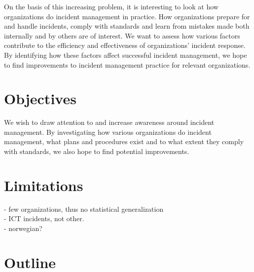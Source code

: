 On the basis of this increasing problem, it is interesting to look at how organizations do incident management in practice. How organizations prepare for and handle incidents, comply with standards and learn from mistakes made both internally and by others are of interest. We want to assess how various factors contribute to the efficiency and effectiveness of organizations’ incident response. By identifying how these factors affect successful incident management, we hope to find improvements to incident management practice for relevant organizations. 




\section{Objectives}
We wish to draw attention to and increase awareness around incident management. By investigating how various organizations do incident management, what plans and procedures exist and to what extent they comply with standards, we also hope to find potential improvements.


\section{Limitations}

- few organizations, thus no statistical generalization\\
- ICT incidents, not other.\\
- norwegian?

\section{Outline}